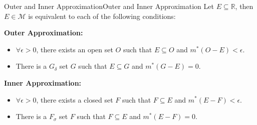 \documentclass[../main.tex]{subfiles}
\begin{document}
\begin{theorem}{Outer and Inner Approximation}{Outer and Inner Approximation}
Let $E \subseteq \mathbb{R}$, then $E\in \mathcal{M}$ is equivalent to each of the following conditions:

\textbf{Outer Approximation:}
\begin{itemize}
\item $\forall \epsilon>0$, there exists an open set $O$ such that $E \subseteq O$ and $m^*(O-E) < \epsilon$.
\item There is a $G_{\delta}$ set $G$ such that $E \subseteq G$ and $m^*(G-E) = 0$.
\end{itemize}

\textbf{Inner Approximation:}
\begin{itemize}
	\item $\forall \epsilon>0$, there exists a closed set $F$ such that $F \subseteq E$ and $m^*(E-F) < \epsilon$.
	\item There is a $F_{\sigma }$ set $F$ such that $F \subseteq E$ and $m^*(E-F) = 0$.
\end{itemize}
\end{theorem}
\end{document}
